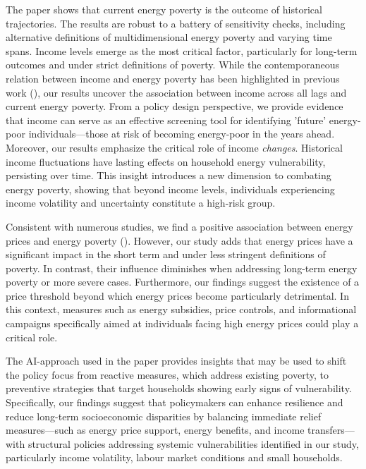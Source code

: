 \documentclass[preprint,authoryear,12pt]{elsarticle}
\newcommand{\citeTwo}[1]{(\cite{#1})}
\begin{document}
The paper shows that current energy poverty is the outcome of historical trajectories. The results are robust to a battery of sensitivity checks, including alternative definitions of multidimensional energy poverty and varying time spans. Income levels emerge as the most critical factor, particularly for long-term outcomes and under strict definitions of poverty. While the contemporaneous relation between income and energy poverty has been highlighted in previous work  \citeTwo{DSv21,vDv22}, our results uncover the association between income across all lags and current energy poverty. From a policy design perspective, we provide evidence that income can serve as an effective screening tool for identifying 'future' energy-poor individuals—those at risk of becoming energy-poor in the years ahead.  Moreover, our results emphasize the critical role of income \textit{changes}. Historical income fluctuations have lasting effects on household energy vulnerability, persisting over time. This insight introduces a new dimension to combating energy poverty, showing that beyond income levels, individuals experiencing income volatility and uncertainty constitute a high-risk group.

Consistent with numerous studies, we find a positive association between  energy prices and energy poverty \citeTwo{PDS21,SRL23}. However, our study adds that energy prices have a significant impact in the short term and under less stringent definitions of poverty. In contrast, their influence diminishes when addressing long-term energy poverty or more severe cases. Furthermore, our findings suggest the existence of a price threshold beyond which energy prices become particularly detrimental. In this context, measures such as energy subsidies, price controls, and informational campaigns specifically aimed at individuals facing high energy prices could play a critical role. 

The AI-approach used in the paper provides insights that may be used to shift the policy focus from reactive measures, which address existing poverty, to preventive strategies that target households showing early signs of vulnerability. Specifically, our findings suggest that policymakers can enhance resilience and reduce long-term socioeconomic disparities by balancing immediate relief measures—such as energy price support, energy benefits, and income transfers—with structural policies addressing systemic vulnerabilities identified in our study, particularly income volatility, labour market conditions and small households. 
\end{document}
